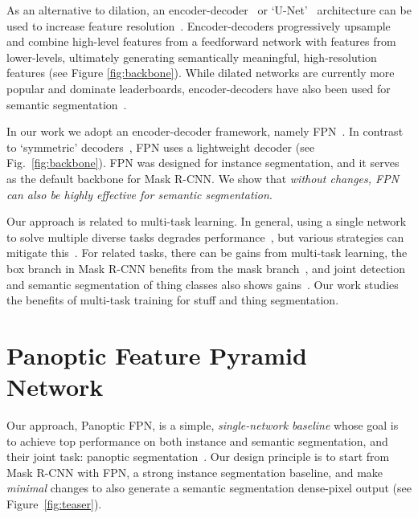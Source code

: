 \documentclass[10pt,twocolumn,letterpaper]{article}
\makeatletter
\renewcommand\paragraph{\@startsection{paragraph}{4}{\z@}{.5em \@plus1ex \@minus.1ex}{-.5em}{\normalfont\normalsize\bfseries}}
\makeatother
\begin{document}
{As an alternative to dilation, an encoder-decoder~\cite{badrinarayanan2015segnet} or `U-Net'~\cite{ronneberger2015u} architecture can be used to increase feature resolution~\cite{honari2016recombinator, newell2016stacked, ghiasi2016laplacian, pinheiro2016learning}. Encoder-decoders progressively upsample and combine high-level features from a feedforward network with features from lower-levels, ultimately generating semantically meaningful, high-resolution features (see Figure \ref{fig:backbone}). While dilated networks are currently more popular and dominate leaderboards, encoder-decoders have also been used for semantic segmentation~\cite{ronneberger2015u, badrinarayanan2015segnet, ghiasi2016laplacian}.

In our work we adopt an encoder-decoder framework, namely FPN~\cite{lin2016feature}. In contrast to `symmetric' decoders~\cite{ronneberger2015u}, FPN uses a lightweight decoder (see Fig.~\ref{fig:backbone}). FPN was designed for instance segmentation, and it serves as the default backbone for Mask R-CNN. We show that \emph{without changes, FPN can also be highly effective for semantic segmentation}.

\paragraph{Multi-task learning:} Our approach is related to multi-task learning. In general, using a single network to solve multiple diverse tasks degrades performance~\cite{kokkinos2016ubernet}, but various strategies can mitigate this~\cite{kendall2017multi,misra2016cross}. For related tasks, there can be gains from multi-task learning, \eg the box branch in Mask R-CNN benefits from the mask branch~\cite{he2017mask}, and joint detection and semantic segmentation of thing classes also shows gains~\cite{bell2016inside, cao2018triply, dvornik2017blitznet, pham2017biseg}. Our work studies the benefits of multi-task training for stuff and thing segmentation.

\section{Panoptic Feature Pyramid Network}

Our approach, Panoptic FPN, is a simple, \emph{single-network baseline} whose goal is to achieve top performance on both instance and semantic segmentation, and their joint task: panoptic segmentation~\cite{kirillov2017panoptic}. Our design principle is to start from Mask R-CNN with FPN, a strong instance segmentation baseline, and make \emph{minimal} changes to also generate a semantic segmentation dense-pixel output (see Figure~\ref{fig:teaser}).

}
\end{document}
